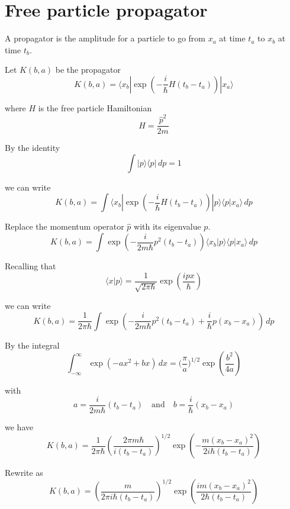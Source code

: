 \documentclass[12pt]{article}
\begin{document}
\section*{Free particle propagator}
A propagator is the amplitude for a particle to go from $x_a$
at time $t_a$ to $x_b$ at time $t_b$.

\bigskip
Let $K(b,a)$ be the propagator
$$
K(b,a)=\langle x_b|\exp\left(-\frac{i}{\hbar}H(t_b-t_a)\right)|x_a\rangle
$$

where $H$ is the free particle Hamiltonian
$$
H=\frac{\hat p^2}{2m}
$$

By the identity
$$
\int|p\rangle\langle p|\,dp=1
$$

we can write
$$
K(b,a)=\int\langle x_b|\exp\left(-\frac{i}{\hbar}H(t_b-t_a)\right)|p\rangle\langle p|x_a\rangle\,dp
$$

Replace the momentum operator $\hat p$ with its eigenvalue $p$.
$$
K(b,a)=\int\exp\left(-\frac{i}{2m\hbar}p^2(t_b-t_a)\right)\langle x_b|p\rangle\langle p|x_a\rangle\,dp
$$

Recalling that
$$
\langle x|p\rangle=\frac{1}{\sqrt{2\pi\hbar}}\exp\left(\frac{ipx}{\hbar}\right)
$$

we can write
$$
K(b,a)=\frac{1}{2\pi\hbar}
\int\exp\left(-\frac{i}{2m\hbar}p^2(t_b-t_a)+\frac{i}{\hbar}p(x_b-x_a)\right)\,dp
$$

By the integral
$$
\int_{-\infty}^\infty
\exp(-ax^2+bx)\,dx=\biggl(\frac{\pi}{a}\biggr)^{1/2}\exp\left(\frac{b^2}{4a}\right)
$$

with
$$
a=\frac{i}{2m\hbar}(t_b-t_a)\quad\text{and}\quad b=\frac{i}{\hbar}(x_b-x_a)
$$

we have
$$
K(b,a)=\frac{1}{2\pi\hbar}
\left(\frac{2\pi m\hbar}{i(t_b-t_a)}\right)^{1/2}
\exp\left(-\frac{m(x_b-x_a)^2}{2i\hbar(t_b-t_a)}\right)
$$

Rewrite as
$$
K(b,a)=
\left(\frac{m}{2\pi i\hbar(t_b-t_a)}\right)^{1/2}
\exp\left(\frac{im(x_b-x_a)^2}{2\hbar(t_b-t_a)}\right)
$$
\end{document}
